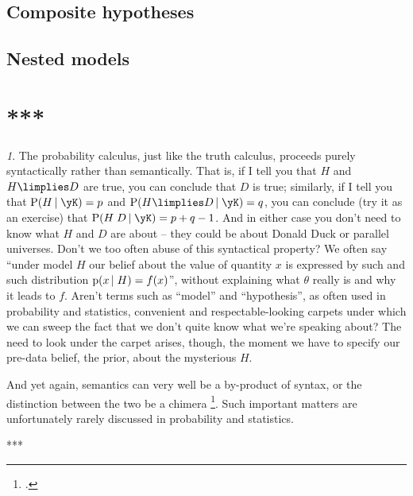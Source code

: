 \documentclass[\ifafour a4paper,12pt,\else a5paper,10pt,\fi%
onecolumn,oneside,article,%
british%
]{memoir}
\theoremstyle{remark}
\theoremstyle{innote}
\newtheorem*{innote}{}
\newcommand*{\citep}{\footcites}
\newcommand*{\pf}{\mathrm{p}}%
\newcommand*{\p}{\mathrm{P}}%
\renewcommand*{\|}[1][]{\nonscript\,#1\vert\nonscript\;\mathopen{}}
\begin{document}
\subsection{Composite hypotheses}
\label{sec:comp_hyp}


\subsection{Nested models}
\label{sec:nested_mods}



\section{***}
\label{sec:***}



\begin{innote}\label{note:syntax}
  The probability calculus, just like the truth calculus, proceeds purely
  syntactically rather than semantically. That is, if I tell you that $H$
  and $H \limplies D$ are true, you can conclude that $D$ is true;
  similarly, if I tell you that $\p(H \| \yK) = p$ and
  $\p(H \limplies D \| \yK) = q$, you can conclude (try it as an exercise)
  that $\p(H\;D \| \yK) = p + q -1$. And in either case you don't need to
  know what $H$ and $D$ are about -- they could be about Donald Duck or
  parallel universes. Don't we too often abuse of this syntactical
  property? We often say \enquote{under model $H$ our belief about the
    value of quantity $x$ is expressed by such and such distribution
    $\pf(x \| H)=f(x)$}, without explaining what $\theta$ really is
  and why it leads to $f$. Aren't terms such as \enquote{model} and
  \enquote{hypothesis}, as often used in probability and statistics,
  convenient and respectable-looking carpets under which we can sweep the
  fact that we don't quite know what we're speaking about? The need to look
  under the carpet arises, though, the moment we have to specify our
  pre-data belief, the prior, about the mysterious $H$.
  
  And yet again, semantics can very well be a by-product of syntax, or the
  distinction between the two be a chimera
  \citep{wittgenstein1945_t1999,girard2001,girard2003}. Such important
  matters are unfortunately rarely discussed in probability and statistics.
\end{innote}



***
\end{document}
